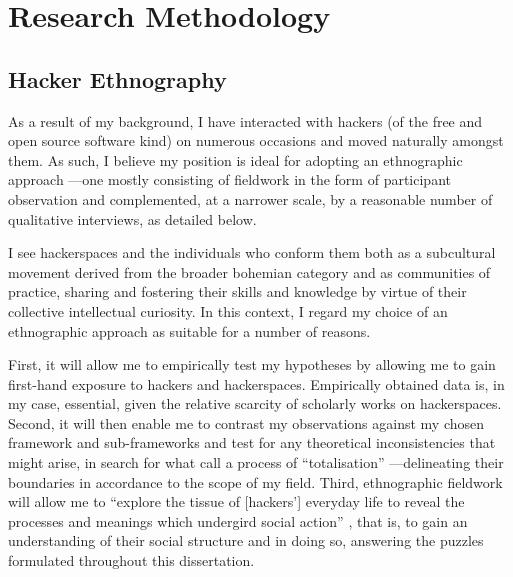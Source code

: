 

\section{Research Methodology}
\label{methodology}


\subsection{Hacker Ethnography}

As a result of my background, I have interacted with hackers (of the free and open source software kind) on numerous occasions and moved naturally amongst them. As such, I believe my position is ideal for adopting an ethnographic approach ---one mostly consisting of fieldwork in the form of participant observation and complemented, at a narrower scale, by a reasonable number of qualitative interviews, as detailed below.

I see hackerspaces and the individuals who conform them both as a subcultural movement derived from the broader bohemian category and as communities of practice, sharing and fostering their skills and knowledge by virtue of their collective intellectual curiosity. In this context, I regard my choice of an ethnographic approach as suitable for a number of reasons. 

First, it will allow me to empirically test my hypotheses by allowing me to gain first-hand exposure to hackers and hackerspaces. Empirically obtained data is, in my case, essential, given the relative scarcity of scholarly works on hackerspaces. Second, it will then enable me to contrast my observations against my chosen framework and sub-frameworks and test for any theoretical inconsistencies that might arise, in search for what \citet{baszanger97} call a process of ``totalisation'' ---delineating their boundaries in accordance to the scope of my field. Third, ethnographic fieldwork will allow me to ``explore the tissue of [hackers'] everyday life to reveal the processes and meanings which undergird social action'' \citep[p.551]{herbert00}, that is, to gain an understanding of their social structure and in doing so, answering the puzzles formulated throughout this dissertation.

